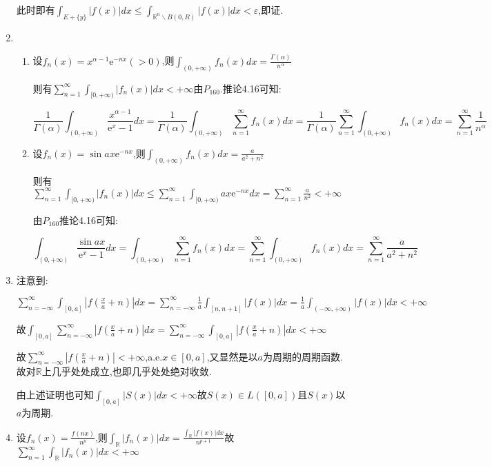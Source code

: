 \documentclass[UTF8, a4paper, 12pt, oneside, onecolumn]{article}
\numberwithin{equation}{section}
\numberwithin{figure}{section}
\numberwithin{table}{section}
\def\e{\mathrm{e}}	%
\theoremstyle{nonumberplain}	%
\theoremstyle{plain}	%
\theoremstyle{plain}	%
\theoremstyle{plain}	%
\theoremstyle{plain}	%
\theoremstyle{nonumberplain}
\begin{document}
\begin{enumerate}
	此时即有$\displaystyle\int_{E+\{y\}}|f(x)|dx\leqslant\int_{\mathbb{R}^n\backslash B(0,R)}|f(x)|dx<\varepsilon $,即证.
	
	\item
	\begin{enumerate}
		\item 设$f_n(x)=x^{\alpha-1}\e^{-nx}(>0)$,则$\displaystyle\int_{(0,+\infty)}f_n(x)dx=\frac{\Gamma(\alpha)}{n^{\alpha}}$
		
		则有$\displaystyle\sum_{n=1}^{\infty}\int_{[0,+\infty)}|f_n(x)|dx<+\infty $由$P_{160}$.推论4.16可知:
		
		$$\frac{1}{\Gamma(\alpha)}\int_{(0,+\infty)}\frac{x^{\alpha-1}}{\e^x-1}dx=\frac{1}{\Gamma(\alpha)}\int_{(0,+\infty)}\sum_{n=1}^{\infty}f_n(x)dx=\frac{1}{\Gamma(\alpha)}\sum_{n=1}^{\infty}\int_{(0,+\infty)}f_n(x)dx=\sum_{n=1}^{\infty}\frac{1}{n^\alpha}$$
		\item
		设$f_n(x)=\sin{ax}\e^{-nx}$,则$\displaystyle\int_{(0,+\infty)}f_n(x)dx=\frac{a}{a^2+n^2}$
		
		则有$\displaystyle\sum_{n=1}^{\infty}\int_{[0,+\infty)}|f_n(x)|dx\leqslant\sum_{n=1}^{\infty}\int_{[0,+\infty)}ax\e^{-nx}dx=\sum_{n=1}^{\infty}\frac{a}{n^2}<+\infty $
		
		由$P_{160}$推论4.16可知:
		
		$$\int_{(0,+\infty)}\frac{\sin{ax}}{\e^x-1}dx=\int_{(0,+\infty)}\sum_{n=1}^{\infty}f_n(x)dx=\sum_{n=1}^{\infty}\int_{(0,+\infty)}f_n(x)dx=\sum_{n=1}^{\infty}\frac{a}{a^2+n^2}$$
	\end{enumerate} 
	\item 注意到:
	
	$\displaystyle \sum_{n=-\infty}^{\infty}\int_{[0,a]}\left|f(\frac{x}{a}+n)\right|dx=\sum_{n=-\infty}^{\infty}\frac{1}{a}\int_{[n,n+1]}|f(x)|dx=\frac{1}{a}\int_{(-\infty,+\infty)}|f(x)|dx<+\infty$
	
	故$\displaystyle\int_{[0,a]}\sum_{n=-\infty}^{\infty}\left|f(\frac{x}{a}+n)\right|dx= \sum_{n=-\infty}^{\infty}\int_{[0,a]}\left|f(\frac{x}{a}+n)\right|dx<+\infty$
	
	故$\displaystyle\sum_{n=-\infty}^{\infty}|f(\frac{x}{a}+n)|<+\infty$,a.e.$x\in [0,a]$,又显然是以$a$为周期的周期函数.故对$\mathbb{R}$上几乎处处成立,也即几乎处处绝对收敛.
	
	由上述证明也可知$\displaystyle\int_{[0,a]}|S(x)|dx<+\infty$故$S(x)\in L([0,a])$且$S(x)$以$a$为周期.
	
	\item 设$\displaystyle f_n(x)=\frac{f(nx)}{n^p}$,则$\displaystyle\int_{\mathbb{R}}|f_n(x)|dx=\frac{\int_{\mathbb{R}}|f(x)|dx}{n^{p+1}}$故$\displaystyle\sum_{n=1}^{\infty}\int_{\mathbb{R}}|f_n(x)|dx<+\infty$
	

\end{enumerate}
\end{document}
